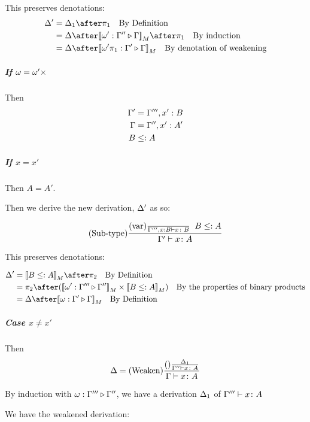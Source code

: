 {        This preserves denotations:
        \begin{align}
            \D' & = \D_1\after\p\qt{By Definition} \\
            & = \D\after\deno{\wrel{\w'}{\G''}{\G}}\after\p\qt{By induction}\\
            & = \D\after\deno{\wrel{\w'\p}{\G'}{\G}}\qt{By denotation of weakening}
        \end{align}

        \subparagraph{If $\omega = \omega'\times$} 
        Then 
        \begin{align}
            \Gamma' & = \Gamma''', x': B\\
            \Gamma &= \Gamma'', x': A'\\
            B & \leq: A
        \end{align}

        \subparagraph{If $x = x'$}

        Then $A = A'$.

        Then we derive the new derivation, $\Delta'$ as so:

        \begin{equation}
            (\text{Sub-type}) \frac{
                (\text{var}) \frac{}{\Gamma''', x: B \vdash x \colon B}
                \;\;
                B \leq: A
            }{
                \Gamma' \vdash x \colon A
            }
        \end{equation}

        This preserves denotations:

        \begin{align}
            \D' & = \deno{B\subtype A}\after\pp\qt{By Definition} \\
             & = \pp\after (\deno{\wrel{\w'}{\G'''}{\G''}}\times \deno{B\subtype A}) \qt{By the properties of binary products}\\
             & = \D\after\deno{\wrel{\w}{\G'}{\G}}\qt{By Definition}
        \end{align}

        \subparagraph{Case $x \neq x'$}
        Then 
        \begin{equation}
            \Delta = (\text{Weaken}) \frac{(\text{}) \frac{\Delta_1}{\Gamma'' \vdash x \colon A}}{\Gamma \vdash x \colon A}
        \end{equation}

        By induction with $\omega : \Gamma''' \triangleright \Gamma''$,
         we have a derivation $\Delta_1$ of $\Gamma''' \vdash x \colon A$

        We have the weakened derivation:

}
